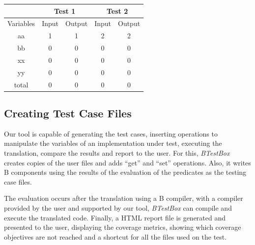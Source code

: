 \documentclass[runningheads]{llncs}
\begin{document}
\begin{center}
\begin{tabular}{c|c|c|c|c|}
\cline{2-5}
                                & \multicolumn{2}{c|}{Test 1} & \multicolumn{2}{c|}{Test 2} \\ \hline
\multicolumn{1}{|c|}{Variables} & Input        & Output       & Input        & Output       \\ \hline
\multicolumn{1}{|c|}{aa}        & 1            & 1            & 2            & 2            \\ \hline
\multicolumn{1}{|c|}{bb}        & 0            & 0            & 0            & 0            \\ \hline
\multicolumn{1}{|c|}{xx}        & 0            & 0            & 0            & 0            \\ \hline
\multicolumn{1}{|c|}{yy}        & 0            & 0            & 0            & 0            \\ \hline
\multicolumn{1}{|c|}{total}     & 0            & 0            & 0            & 0            \\ \hline
\end{tabular}
\end{center}

\subsection{Creating Test Case Files}

Our tool is capable of generating the test cases, inserting operations to manipulate the variables of an implementation under test, executing the translation, compare the results and report to the user. For this, \textit{BTestBox} creates copies of the user files and adds ``get'' and ``set'' operations. Also, it writes B components using the results of the evaluation of the predicates as the testing case files.

The evaluation occurs after the translation using a B compiler, with a compiler provided by the user and supported by our tool, \textit{BTestBox} can compile and execute the translated code. Finally, a HTML report file is generated and presented to the user, displaying the coverage metrics, showing which coverage objectives are not reached and a shortcut for all the files used on the test.
\end{document}
